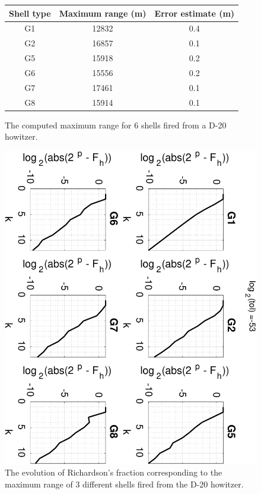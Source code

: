 \documentclass[runningheads]{llncs}
\begin{document}
\begin{figure}
  \centering
  \begin{tabular}{c|c|c}
    Shell type & Maximum range (m) & Error estimate (m) \\ \hline
    G1      &     12832    &            0.4 \\
    G2      &     16857    &            0.1 \\
    G5      &     15918    &            0.2 \\
    G6      &     15556    &            0.2 \\
    G7      &     17461    &            0.1 \\
    G8      &     15914    &            0.1 \\
  \end{tabular}
  \caption{The computed maximum range for 6 shells fired from a D-20 howitzer.}
  \label{fig:maxrange_rk1_table_tol53} 
\end{figure}

\begin{figure}[t!]
  \centering
  \includegraphics[width=\linewidth]{maxrange_rk1_tol53.pdf}
  \caption{The evolution of Richardson's fraction corresponding to the maximum range of 3 different shells fired from the D-20 howitzer.} \label{fig:maxrange_rk1_fraction_tol53}
\end{figure}
\end{document}
